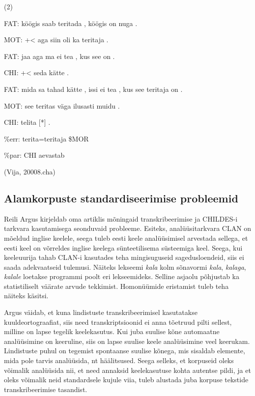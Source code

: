 \documentclass[12pt]{article}
\begin{document}
(2)
\begin{description}
    \item*FAT:   köögis saab teritada , köögis on nuga .
    \item*MOT:   +< aga siin oli ka teritaja .
    \item*FAT:   jaa aga ma ei tea , kus see on .
    \item*CHI:   +< seda kätte .
    \item*FAT:   mida sa tahad kätte , issi ei tea , kus see teritaja on .
    \item*MOT:   see teritas väga ilusasti muidu .
    \item*CHI:   telita [*] .
    \item\%err:   terita=teritaja \$MOR
    \item\%par:   CHI aevastab
    \item(Vija, 20008.cha)
\end{description}


\subsection{Alamkorpuste standardiseerimise probleemid}

Reili Argus kirjeldab oma artiklis \citep{Argus2007} mõningaid transkribeerimise ja CHILDES-i tarkvara kasutamisega seonduvaid probleeme. Esiteks, analüüsitarkvara CLAN on mõeldud inglise keelele, seega tuleb eesti keele analüüsimisel arvestada sellega, et eesti keel on võrreldes inglise keelega sünteetilisema süsteemiga keel. Seega, kui keeleuurija tahab CLAN-i kasutades teha mingisuguseid sagedusloendeid, siis ei saada adekvaatseid tulemusi. Näiteks lekseemi \emph{kala} kolm sõnavormi \emph{kala}, \emph{kalaga}, \emph{kalale} loetakse programmi poolt eri lekseemideks. Selline asjaolu põhjustab ka statistiliselt väärate arvude tekkimist. Homonüümide eristamist tuleb teha näiteks käsitsi.\citep[70]{Argus2007}

Argus väidab, et kuna lindistuste transkribeerimisel kasutatakse kuuldeortograafiat, siis need transkriptsioonid ei anna tõetruud pilti sellest, milline on lapse tegelik keelekasutus. Kui juba suulise kõne automaatne analüüsimine on keeruline, siis on lapse suulise keele analüüsimine veel keerukam. Lindistuste puhul on tegemist spontaanse suulise kõnega, mis sisaldab elemente, mida pole tarvis analüüsida, nt häälitsused. Seega selleks, et korpuseid oleks võimalik analüüsida nii, et need annaksid keelekasutuse kohta autentse pildi, ja et oleks võimalik neid standardsele kujule viia, tuleb alustada juba korpuse tekstide transkribeerimise tasandist. \citep[71]{Argus2007}
\end{document}
